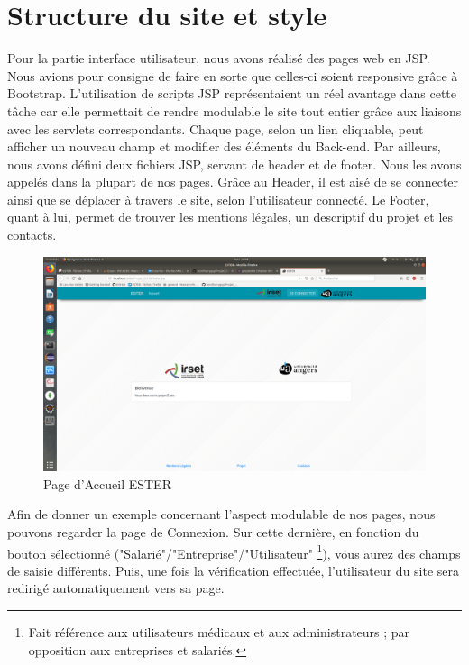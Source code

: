 \section{Structure du site et style}


Pour la partie interface utilisateur, nous avons réalisé des pages web en JSP. Nous avions pour consigne de faire en sorte que celles-ci soient responsive grâce à Bootstrap. L'utilisation de scripts JSP représentaient un réel avantage dans cette tâche car elle permettait de rendre modulable le site tout entier grâce aux liaisons avec les servlets correspondants. Chaque page, selon un lien cliquable, peut afficher un nouveau champ et modifier des éléments du Back-end. Par ailleurs, nous avons défini deux fichiers JSP, servant de header et de footer. Nous les avons appelés dans la plupart de nos pages. Grâce au Header, il est aisé de se connecter ainsi que se déplacer à travers le site, selon l'utilisateur connecté. Le Footer, quant à lui, permet de trouver les mentions légales, un descriptif du projet et les contacts.

\begin{figure}[ht]
    \begin{center}
	\includegraphics[scale=0.2,trim=4cm 0cm 4cm 5.3cm, clip=true]{img/ESTER}
    \end{center}
    \caption{Page d'Accueil ESTER}
\end{figure}

Afin de donner un exemple concernant l'aspect modulable de nos pages, nous pouvons regarder la page de Connexion. Sur cette dernière, en fonction du bouton sélectionné ("Salarié"/"Entreprise"/"Utilisateur" \footnote{Fait référence aux utilisateurs médicaux et aux administrateurs ; par opposition aux entreprises et salariés.}), vous aurez des champs de saisie différents. Puis, une fois la vérification effectuée, l'utilisateur du site sera redirigé automatiquement vers sa page.

